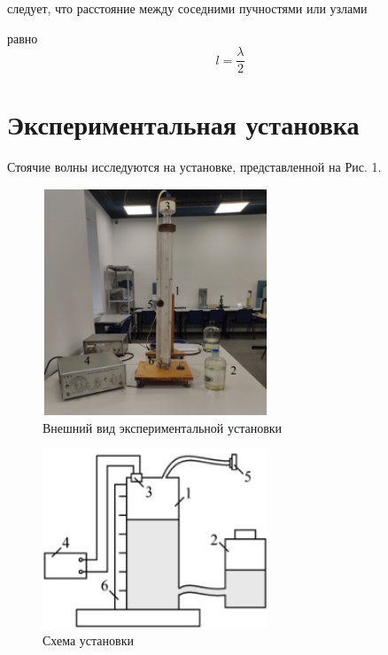 \documentclass[a4paper]{article}
\begin{document}
следует, что расстояние между соседними пучностями или узлами

равно
\[
l = \frac{\lambda}{2}
\]
\section{Экспериментальная установка}

Стоячие волны исследуются на установке, представленной на
Рис. 1.

\begin{figure}[H]
    \begin{center}
        \includegraphics[width=0.6\textwidth]{fig_1}
        \caption{Внешний вид экспериментальной установки}
    \end{center}
\end{figure}


\begin{figure}[H]
    \begin{center}
        \includegraphics[width=0.6\textwidth]{fig_2}
        \caption{Схема установки}
    \end{center}
\end{figure}
\end{document}
